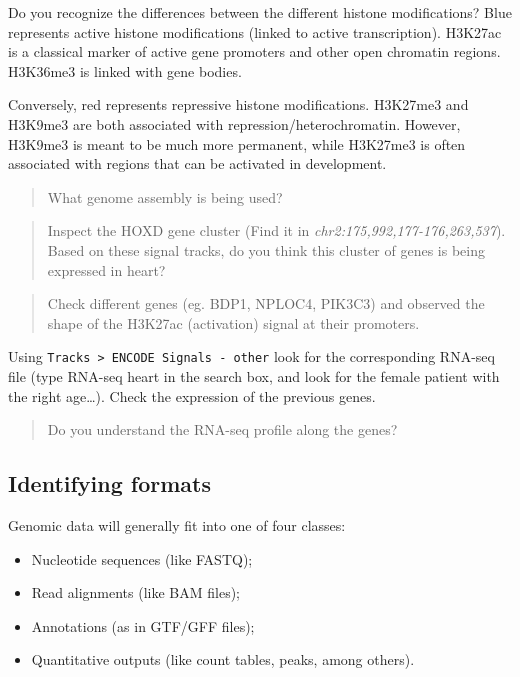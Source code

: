 \documentclass[
]{book}
\providecommand{\tightlist}{%
  \setlength{\itemsep}{0pt}\setlength{\parskip}{0pt}}
\begin{document}
Do you recognize the differences between the different histone modifications? Blue represents active histone modifications (linked to active transcription). H3K27ac is a classical marker of active gene promoters and other open chromatin regions. H3K36me3 is linked with gene bodies.

Conversely, red represents repressive histone modifications. H3K27me3 and H3K9me3 are both associated with repression/heterochromatin. However, H3K9me3 is meant to be much more permanent, while H3K27me3 is often associated with regions that can be activated in development.

\begin{quote}
What genome assembly is being used?
\end{quote}

\begin{quote}
Inspect the HOXD gene cluster (Find it in \emph{chr2:175,992,177-176,263,537}). Based on these signal tracks, do you think this cluster of genes is being expressed in heart?
\end{quote}

\begin{quote}
Check different genes (eg. BDP1, NPLOC4, PIK3C3) and observed the shape of the H3K27ac (activation) signal at their promoters.
\end{quote}

Using \texttt{Tracks\ \textgreater{}\ ENCODE\ Signals\ -\ other} look for the corresponding RNA-seq file (type RNA-seq heart in the search box, and look for the female patient with the right age\ldots).
Check the expression of the previous genes.

\begin{quote}
Do you understand the RNA-seq profile along the genes?
\end{quote}

\hypertarget{identifying-formats}{%
\subsection{Identifying formats}\label{identifying-formats}}

Genomic data will generally fit into one of four classes:

\begin{itemize}
\tightlist
\item
  Nucleotide sequences (like FASTQ);
\item
  Read alignments (like BAM files);
\item
  Annotations (as in GTF/GFF files);
\item
  Quantitative outputs (like count tables, peaks, among others).
\end{itemize}
\end{document}
